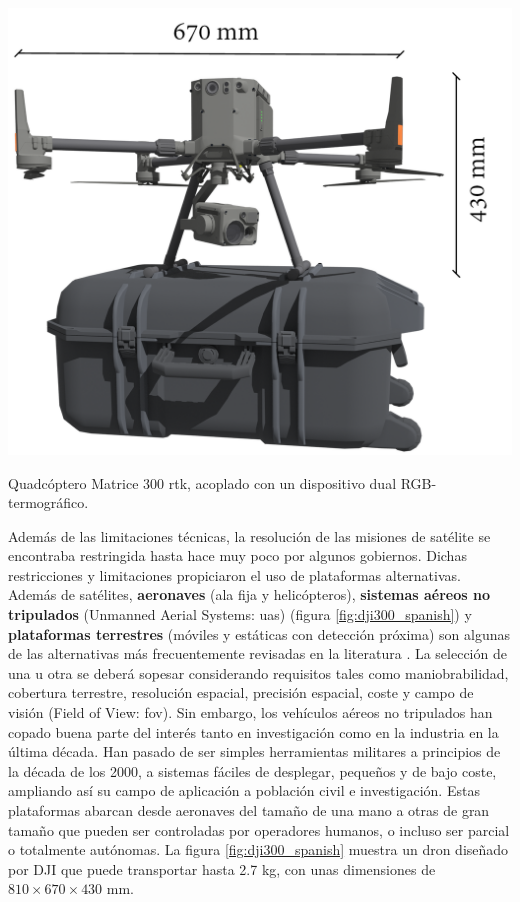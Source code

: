\begin{marginfigure}[.7cm]
	\includegraphics{figs/introduction/dji300.png}
	\caption{Quadcóptero Matrice 300 \acrshort{rtk}, acoplado con un dispositivo dual RGB-termográfico. }
	\label{fig:dji300_spanish}
\end{marginfigure}
Además de las limitaciones técnicas, la resolución de las misiones de satélite se encontraba restringida hasta hace muy poco por algunos gobiernos. Dichas restricciones y limitaciones propiciaron el uso de plataformas alternativas. Además de satélites, \textbf{aeronaves} (ala fija y helicópteros), \textbf{sistemas aéreos no tripulados} (Unmanned Aerial Systems: \acrshort{uas}) (figura \ref{fig:dji300_spanish}) y \textbf{plataformas terrestres} (móviles y estáticas con detección próxima) son algunas de las alternativas más frecuentemente revisadas en la literatura \cite{lillesand_remote_2015}. La selección de una u otra se deberá sopesar considerando requisitos tales como maniobrabilidad, cobertura terrestre, resolución espacial, precisión espacial, coste y campo de visión (Field of View: \acrshort{fov}). Sin embargo, los vehículos aéreos no tripulados han copado buena parte del interés tanto en investigación como en la industria en la última década. Han pasado de ser simples herramientas militares a principios de la década de los 2000, a sistemas fáciles de desplegar, pequeños y de bajo coste, ampliando así su campo de aplicación a población civil e investigación. Estas plataformas abarcan desde aeronaves del tamaño de una mano a otras de gran tamaño que pueden ser controladas por operadores humanos, o incluso ser parcial o totalmente autónomas. La figura \ref{fig:dji300_spanish} muestra un dron diseñado por DJI que puede transportar hasta 2.7 \si{\kilo\gram}, con unas dimensiones de $810 \times 670 \times 430$ \si{\milli\meter}.

